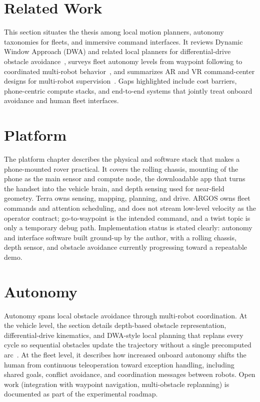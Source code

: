 \documentclass[11pt,a4paper]{article}
\begin{document}
\section{Related Work}
\label{sec:related}
This section situates the thesis among local motion planners, autonomy taxonomies for fleets, and immersive command interfaces.
It reviews Dynamic Window Approach (DWA) and related local planners for differential-drive obstacle avoidance~\citep{fox1997dwa}, surveys fleet autonomy levels from waypoint following to coordinated multi-robot behavior~\citep{parker1998alliance,dias2006market}, and summarizes AR and VR command-center designs for multi-robot supervision~\citep{chen2018survey,milgram1994continuum}.
Gaps highlighted include cost barriers, phone-centric compute stacks, and end-to-end systems that jointly treat onboard avoidance and human fleet interfaces.

\section{Platform}
\label{sec:platform}
The platform chapter describes the physical and software stack that makes a phone-mounted rover practical.
It covers the rolling chassis, mounting of the phone as the main sensor and compute node, the downloadable app that turns the handset into the vehicle brain, and depth sensing used for near-field geometry.
Terra owns sensing, mapping, planning, and drive. ARGOS owns fleet commands and attention scheduling, and does not stream low-level velocity as the operator contract; go-to-waypoint is the intended command, and a twist topic is only a temporary debug path.
Implementation status is stated clearly: autonomy and interface software built ground-up by the author, with a rolling chassis, depth sensor, and obstacle avoidance currently progressing toward a repeatable demo.

\section{Autonomy}
\label{sec:autonomy}
Autonomy spans local obstacle avoidance through multi-robot coordination.
At the vehicle level, the section details depth-based obstacle representation, differential-drive kinematics, and DWA-style local planning that replans every cycle so sequential obstacles update the trajectory without a single precomputed arc~\citep{fox1997dwa}.
At the fleet level, it describes how increased onboard autonomy shifts the human from continuous teleoperation toward exception handling, including shared goals, conflict avoidance, and coordination messages between robots.
Open work (integration with waypoint navigation, multi-obstacle replanning) is documented as part of the experimental roadmap.
\end{document}
